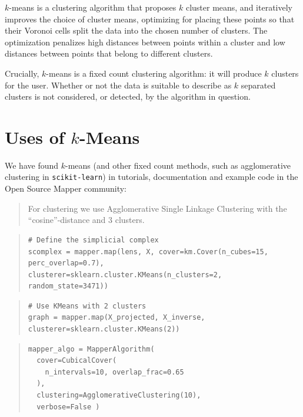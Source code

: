 \documentclass{amsart}
\begin{document}
$k$-means is a clustering algorithm that proposes $k$ cluster means, and iteratively improves the choice of cluster means, optimizing for placing these points so that their Voronoi cells split the data into the chosen number of clusters. The optimization penalizes high distances between points within a cluster and low distances between points that belong to different clusters.

Crucially, $k$-means is a fixed count clustering algorithm: it will produce $k$ clusters for the user. Whether or not the data is suitable to describe as $k$ separated clusters is not considered, or detected, by the algorithm in question.

\section{Uses of $k$-Means}

We have found $k$-means (and other fixed count methods, such as agglomerative clustering in \texttt{scikit-learn}) in tutorials, documentation and example code in the Open Source Mapper community:

\begin{quote}
For clustering we use Agglomerative Single Linkage Clustering with the “cosine”-distance and 3 clusters.
\end{quote}

\begin{quote}
    \begin{verbatim}
# Define the simplicial complex
scomplex = mapper.map(lens, X, cover=km.Cover(n_cubes=15, perc_overlap=0.7),
clusterer=sklearn.cluster.KMeans(n_clusters=2, random_state=3471))        
    \end{verbatim}
\end{quote}

\begin{quote}
    \begin{verbatim}
# Use KMeans with 2 clusters
graph = mapper.map(X_projected, X_inverse, 
clusterer=sklearn.cluster.KMeans(2))        
    \end{verbatim}
\end{quote}

\begin{quote}
    \begin{verbatim}
mapper_algo = MapperAlgorithm(
  cover=CubicalCover(
    n_intervals=10, overlap_frac=0.65 
  ), 
  clustering=AgglomerativeClustering(10),
  verbose=False )        
    \end{verbatim}
\end{quote}
\end{document}
